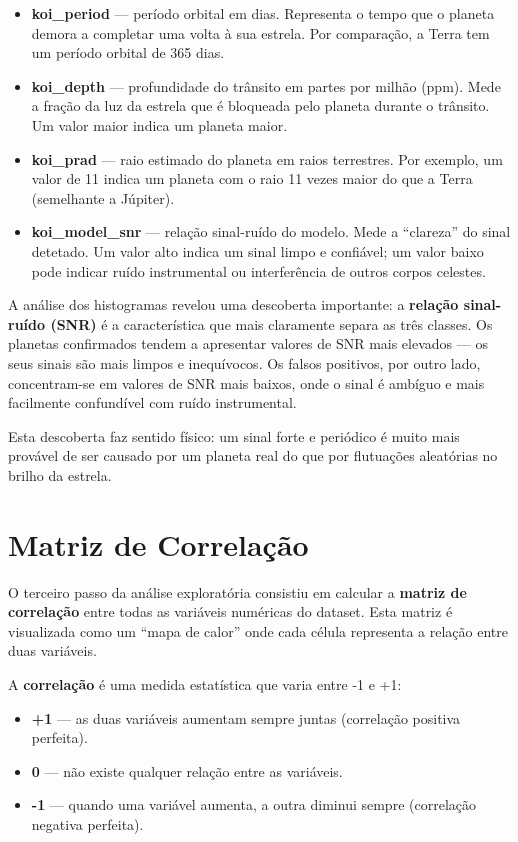 \documentclass[12pt, a4paper]{report}
\begin{document}
\begin{itemize}
    \item \textbf{koi\_period} — período orbital em dias. Representa o tempo que o planeta demora a completar uma volta à sua estrela. Por comparação, a Terra tem um período orbital de 365 dias.

    \item \textbf{koi\_depth} — profundidade do trânsito em partes por milhão (ppm). Mede a fração da luz da estrela que é bloqueada pelo planeta durante o trânsito. Um valor maior indica um planeta maior.

    \item \textbf{koi\_prad} — raio estimado do planeta em raios terrestres. Por exemplo, um valor de 11 indica um planeta com o raio 11 vezes maior do que a Terra (semelhante a Júpiter).

    \item \textbf{koi\_model\_snr} — relação sinal-ruído do modelo. Mede a ``clareza'' do sinal detetado. Um valor alto indica um sinal limpo e confiável; um valor baixo pode indicar ruído instrumental ou interferência de outros corpos celestes.
\end{itemize}

A análise dos histogramas revelou uma descoberta importante: a \textbf{relação sinal-ruído (SNR)} é a característica que mais claramente separa as três classes. Os planetas confirmados tendem a apresentar valores de SNR mais elevados — os seus sinais são mais limpos e inequívocos. Os falsos positivos, por outro lado, concentram-se em valores de SNR mais baixos, onde o sinal é ambíguo e mais facilmente confundível com ruído instrumental.

Esta descoberta faz sentido físico: um sinal forte e periódico é muito mais provável de ser causado por um planeta real do que por flutuações aleatórias no brilho da estrela.

\section{Matriz de Correlação}

O terceiro passo da análise exploratória consistiu em calcular a \textbf{matriz de correlação} entre todas as variáveis numéricas do dataset. Esta matriz é visualizada como um ``mapa de calor'' onde cada célula representa a relação entre duas variáveis.

\begin{caixaconceito}
A \textbf{correlação} é uma medida estatística que varia entre -1 e +1:
\begin{itemize}
    \item \textbf{+1} — as duas variáveis aumentam sempre juntas (correlação positiva perfeita).
    \item \textbf{0} — não existe qualquer relação entre as variáveis.
    \item \textbf{-1} — quando uma variável aumenta, a outra diminui sempre (correlação negativa perfeita).
\end{itemize}
\end{caixaconceito}
\end{document}
